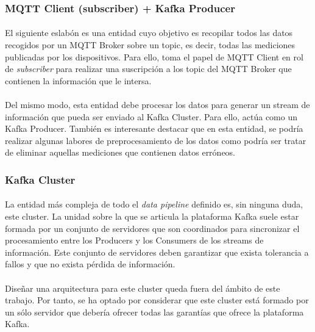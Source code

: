 \documentclass[12pt, a4paper]{article}
\begin{document}
        \subsubsection{MQTT Client (subscriber) + Kafka Producer}

        \paragraph{}
        El siguiente eslabón es una entidad cuyo objetivo es recopilar todos las datos recogidos por un MQTT Broker sobre un topic, es decir, todas las mediciones publicadas por los dispositivos. Para ello, toma el papel de MQTT Client en rol de \textit{subscriber} para realizar una suscripción a los topic del MQTT Broker que contienen la información que le intersa.

        \paragraph{}
        Del mismo modo, esta entidad debe procesar los datos para generar un stream de información que pueda ser enviado al Kafka Cluster. Para ello, actúa como un Kafka Producer. También es interesante destacar que en esta entidad, se podría realizar algunas labores de preprocesamiento de los datos como podría ser tratar de eliminar aquellas mediciones que contienen datos erróneos.

        \subsubsection{Kafka Cluster}

        \paragraph{}
        La entidad más compleja de todo el \textit{data pipeline} definido es, sin ninguna duda, este cluster. La unidad sobre la que se articula la plataforma Kafka suele estar formada por un conjunto de servidores que son coordinados para sincronizar el procesamiento entre los Producers y los Consumers de los streams de información. Este conjunto de servidores deben garantizar que exista tolerancia a fallos y que no exista pérdida de información.

        \paragraph{}
        Diseñar una arquitectura para este cluster queda fuera del ámbito de este trabajo. Por tanto, se ha optado por considerar que este cluster está formado por un sólo servidor que debería ofrecer todas las garantías que ofrece la plataforma Kafka.
\end{document}
